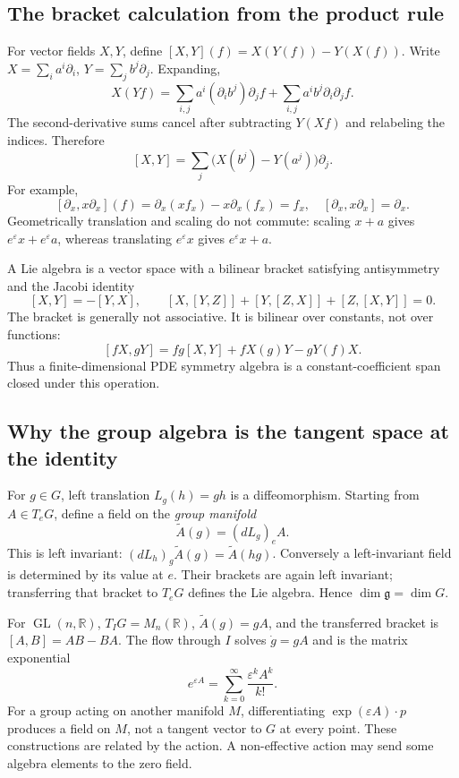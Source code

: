 \documentclass[11pt,a4paper]{article}
\numberwithin{equation}{section}
\theoremstyle{definition}
\theoremstyle{plain}
\theoremstyle{remark}
\newcommand{\R}{\mathbb R}
\newcommand{\g}{\mathfrak g}
\newcommand{\GL}{\operatorname{GL}}
\begin{document}
\subsection{The bracket calculation from the product rule}
For vector fields $X,Y$, define $[X,Y](f)=X(Y(f))-Y(X(f))$. Write $X=\sum_i a^i\partial_i$, $Y=\sum_j b^j\partial_j$. Expanding,
\[
X(Yf)=\sum_{i,j}a^i(\partial_i b^j)\partial_jf
+\sum_{i,j}a^ib^j\partial_i\partial_jf.
\]
The second-derivative sums cancel after subtracting $Y(Xf)$ and relabeling the indices. Therefore
\begin{equation}\label{eq:bracket}
\boxed{[X,Y]=\sum_j\bigl(X(b^j)-Y(a^j)\bigr)\partial_j.}
\end{equation}
For example,
\[
[\partial_x,x\partial_x](f)
=\partial_x(xf_x)-x\partial_x(f_x)=f_x,
\quad [\partial_x,x\partial_x]=\partial_x.
\]
Geometrically translation and scaling do not commute: scaling $x+a$ gives $e^\varepsilon x+e^\varepsilon a$, whereas translating $e^\varepsilon x$ gives $e^\varepsilon x+a$.

A Lie algebra is a vector space with a bilinear bracket satisfying antisymmetry and the Jacobi identity
\[
[X,Y]=-[Y,X],\qquad [X,[Y,Z]]+[Y,[Z,X]]+[Z,[X,Y]]=0.
\]
The bracket is generally not associative. It is bilinear over constants, not over functions:
\[
[fX,gY]=fg[X,Y]+fX(g)Y-gY(f)X.
\]
Thus a finite-dimensional PDE symmetry algebra is a constant-coefficient span closed under this operation.

\subsection{Why the group algebra is the tangent space at the identity}
For $g\in G$, left translation $L_g(h)=gh$ is a diffeomorphism. Starting from $A\in T_eG$, define a field on the \emph{group manifold}
\[
\widetilde A(g)=(dL_g)_eA.
\]
This is left invariant: $(dL_h)_g\widetilde A(g)=\widetilde A(hg)$. Conversely a left-invariant field is determined by its value at $e$. Their brackets are again left invariant; transferring that bracket to $T_eG$ defines the Lie algebra. Hence $\dim\g=\dim G$.

For $\GL(n,\R)$, $T_IG=M_n(\R)$, $\widetilde A(g)=gA$, and the transferred bracket is $[A,B]=AB-BA$. The flow through $I$ solves $\dot g=gA$ and is the matrix exponential
\[
e^{\varepsilon A}=\sum_{k=0}^{\infty}\frac{\varepsilon^kA^k}{k!}.
\]
For a group acting on another manifold $M$, differentiating $\exp(\varepsilon A)\cdot p$ produces a field on $M$, not a tangent vector to $G$ at every point. These constructions are related by the action. A non-effective action may send some algebra elements to the zero field.
\end{document}
